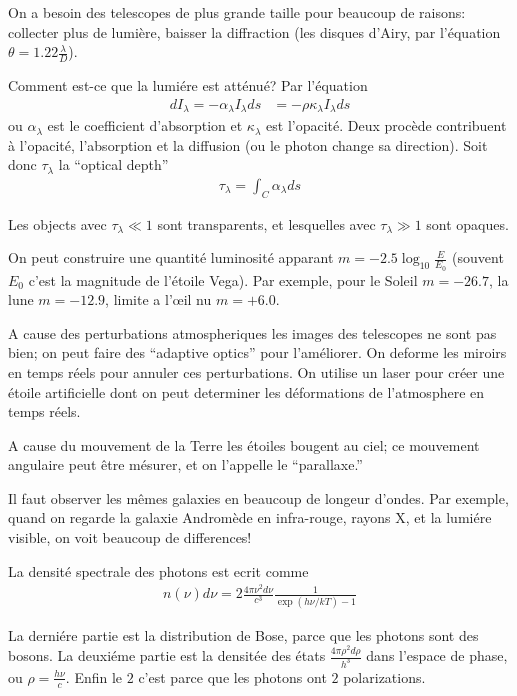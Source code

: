 \documentclass[10pt]{report}
\begin{document}
On a besoin des telescopes de plus grande taille pour beaucoup de raisons: collecter plus de lumi\`ere, baisser la diffraction (les disques d'Airy, par l'\'equation $\theta = 1.22 \frac{\lambda}{D}$).  

Comment est-ce que la lumi\'ere est att\'enu\'e? Par l'\'equation
\begin{align}
    dI_\lambda = -\alpha_\lambda I_\lambda ds &= -\rho \kappa_\lambda I_\lambda ds
\end{align}
ou $\alpha_\lambda$ est le coefficient d'absorption et $\kappa_\lambda$ est l'opacit\'e. Deux proc\`ede contribuent \`a l'opacit\'e, l'absorption et la diffusion (ou le photon change sa direction). Soit donc $\tau_\lambda$ la ``optical depth''
\begin{align}
    \tau_\lambda = \int_C \alpha_\lambda ds
\end{align}

Les objects avec $\tau_\lambda \ll 1$ sont transparents, et lesquelles avec $\tau_\lambda \gg 1$ sont opaques.

On peut construire une quantit\'e luminosit\'e apparant $m = -2.5 \log_{10} \frac{E}{E_0}$ (souvent $E_0$ c'est la magnitude de l'\'etoile Vega). Par exemple, pour le Soleil $m = -26.7$, la lune $m = -12.9$, limite a l'\oe il nu $m = +6.0$.

A cause des perturbations atmospheriques les images des telescopes ne sont pas bien; on peut faire des ``adaptive optics'' pour l'am\'eliorer. On deforme les miroirs en temps r\'eels pour annuler ces perturbations. On utilise un laser pour cr\'eer une \'etoile artificielle dont on peut determiner les d\'eformations de l'atmosphere en temps r\'eels.

A cause du mouvement de la Terre les \'etoiles bougent au ciel; ce mouvement angulaire peut \^etre m\'esurer, et on l'appelle le ``parallaxe.''

Il faut observer les m\^emes galaxies en beaucoup de longeur d'ondes. Par exemple, quand on regarde la galaxie Androm\`ede en infra-rouge, rayons X, et la lumi\'ere visible, on voit beaucoup de differences!

La densit\'e spectrale des photons est ecrit comme
\begin{align}
    n(\nu) d\nu = 2\frac{4\pi \nu^2 d\nu}{c^3}\frac{1}{\exp\left( h\nu/kT \right) - 1}
\end{align}

La derni\'ere partie est la distribution de Bose, parce que les photons sont des bosons. La deuxi\'eme partie est la densit\'ee des \'etats $\frac{4\pi \rho^2 d\rho}{h^3}$ dans l'espace de phase, ou $\rho = \frac{h\nu}{c}$. Enfin le $2$ c'est parce que les photons ont $2$ polarizations.
\end{document}
